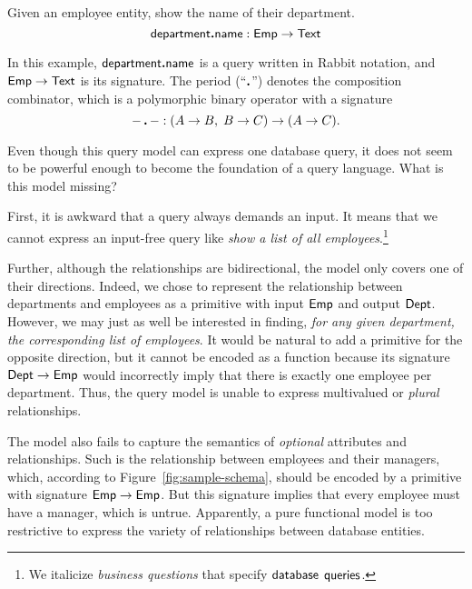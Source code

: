 \begin{demo}
    \label{ex:composite-query}
    Given an employee entity, show the name of their department.
    \begin{equation*}
        \mathsf{department}\boldsymbol{.}\mathsf{name}: \mathsf{Emp} \to \mathsf{Text}
    \end{equation*}
\end{demo}

In this example, $\mathsf{department}\boldsymbol{.}\mathsf{name}$ is a query written in Rabbit notation,
and $\mathsf{Emp} \to \mathsf{Text}$ is its signature.  The period (``$\boldsymbol{.}$'') denotes the
composition combinator, which is a polymorphic binary operator with a signature
\begin{equation*}
        {-}\,\boldsymbol{.}\,{-} : (A \to B,\; B \to C) \to (A \to C).
\end{equation*}

Even though this query model can express one database query, it does not seem
to be powerful enough to become the foundation of a query language.  What is
this model missing?

First, it is awkward that a query always demands an input.  It means that we
cannot express an input-free query like \emph{show a list of all
employees}.\footnote{We italicize \emph{business questions} that specify
$\mathsf{database}$ $\mathsf{queries}$.}

Further, although the relationships are bidirectional, the model only covers
one of their directions.  Indeed, we chose to represent the relationship
between departments and employees as a primitive with input $\mathsf{Emp}$ and output
$\mathsf{Dept}$.  However, we may just as well be interested in finding, \emph{for any
given department, the corresponding list of employees}.  It would be natural to
add a primitive for the opposite direction, but it cannot be encoded as a
function because its signature $\mathsf{Dept} \to \mathsf{Emp}$ would incorrectly imply that
there is exactly one employee per department.  Thus, the query model is unable
to express multivalued or \emph{plural} relationships.

The model also fails to capture the semantics of \emph{optional} attributes and
relationships.  Such is the relationship between employees and their managers,
which, according to Figure~\ref{fig:sample-schema}, should be encoded by a
primitive with signature $\mathsf{Emp} \to \mathsf{Emp}$.  But this signature implies that
every employee must have a manager, which is untrue.  Apparently, a pure
functional model is too restrictive to express the variety of relationships
between database entities.

